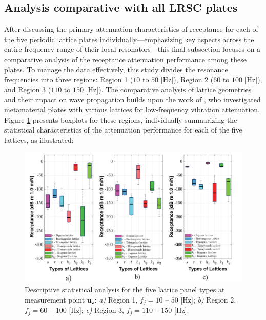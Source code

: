 \documentclass[review,numbers,sort&compress]{elsarticle}
\begin{document}
\subsection{Analysis comparative with all LRSC plates}\label{comp_panels_all_lats}
After discussing the primary attenuation characteristics of receptance for each of the five periodic lattice plates individually---emphasizing key aspects across the entire frequency range of their local resonators---this final subsection focuses on a comparative analysis of the receptance attenuation performance among these plates. To manage the data effectively, this study divides the resonance frequencies into three regions: Region 1 ($10$ to $50$ [Hz]), Region 2 ($60$ to $100$ [Hz]), and Region 3 ($110$ to $150$ [Hz]). The comparative analysis of lattice geometries and their impact on wave propagation builds upon the work of \cite{Yan2022}, who investigated metamaterial plates with various lattices for low-frequency vibration attenuation.
Figure \ref{all_comp_frf_stat_lat} presents boxplots for these regions, individually summarizing the statistical characteristics of the attenuation performance for each of the five lattices, as illustrated:
\newpage
\begin{figure}[htb]
	\centering	
	\includegraphics[width=1.0\textwidth]{all_comp_frf_stat_lat.pdf}	
	\caption{Descriptive statistical analysis for the five lattice panel types at measurement point $\mathbf{u_z}$: \textit{a)} Region 1, $f_j = 10$ -- $50$ [Hz]; \textit{b)} Region 2, $f_j = 60$ -- $100$ [Hz]; \textit{c)} Region 3, $f_j = 110$ -- $150$ [Hz].}
	\label{all_comp_frf_stat_lat}
\end{figure}
\end{document}
